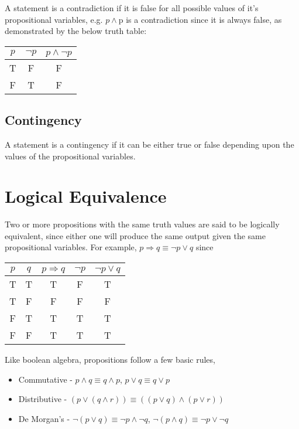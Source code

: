 A statement is a contradiction if it is false for all possible values of it's propositional variables, e.g.
 $p \wedge \mathrm{p}$ is a contradiction since it is always false, as demonstrated by the below truth table:
\begin{table}[h]
  \centering
  \begin{tabular}{ c c c }
    $p$ & $\neg p$ & $p \wedge \neg p$ \\
    \hline
    T & F & F \\
    F & T & F \\
  \end{tabular}
\end{table}

\subsection*{Contingency}

A statement is a contingency if it can be either true or false depending upon the values of the propositional variables.

\section*{Logical Equivalence}

Two or more propositions with the same truth values are said to be logically equivalent, since either one will produce
 the same output given the same propositional variables. For example, $p \Rightarrow q \equiv \neg p \vee q$ since
\begin{table}[h]
  \centering
  \begin{tabular}{ c c c c c }
    $p$ & $q$ & $p \Rightarrow q$ & $\neg p$ & $\neg p \vee q$ \\
    \hline
    T & T & T & F & T \\
    T & F & F & F & F \\
    F & T & T & T & T \\
    F & F & T & T & T \\
  \end{tabular}
\end{table}

Like boolean algebra, propositions follow a few basic rules,
\begin{itemize}
  \item Commutative - $p \wedge q \equiv q \wedge p$, $p \vee q \equiv q \vee p$
  \item Distributive - $(p \vee (q \wedge r)) \equiv ((p \vee q) \wedge (p \vee r))$
  \item De Morgan's - $\neg (p \vee q) \equiv \neg p \wedge \neg q$, $\neg (p \wedge q) \equiv \neg p \vee \neg q$
\end{itemize}


